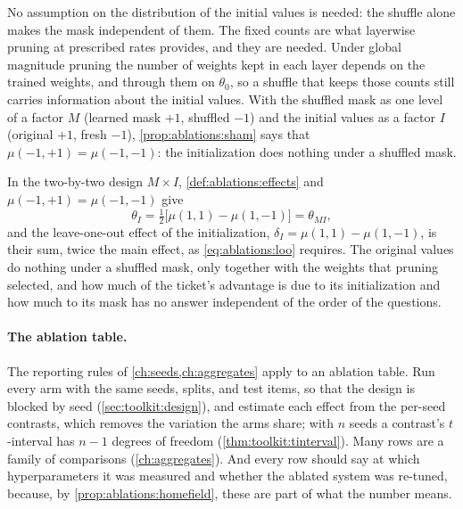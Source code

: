 \begin{refsection}
No assumption on the distribution of the initial values is needed: the shuffle alone makes the mask independent of them. The fixed counts are what layerwise pruning at prescribed rates provides, and they are needed. Under global magnitude pruning the number of weights kept in each layer depends on the trained weights, and through them on $\theta_0$, so a shuffle that keeps those counts still carries information about the initial values. With the shuffled mask as one level of a factor $M$ (learned mask $+1$, shuffled $-1$) and the initial values as a factor $I$ (original $+1$, fresh $-1$), \cref{prop:ablations:sham} says that $\mu(-1,+1)=\mu(-1,-1)$: the initialization does nothing under a shuffled mask.

\begin{example}\label{exa:ablations:pure}
In the two-by-two design $M\times I$, \cref{def:ablations:effects} and $\mu(-1,+1)=\mu(-1,-1)$ give
\[
\theta_I=\tfrac12\bigl[\mu(1,1)-\mu(1,-1)\bigr]=\theta_{MI},
\]
and the leave-one-out effect of the initialization, $\delta_I=\mu(1,1)-\mu(1,-1)$, is their sum, twice the main effect, as \eqref{eq:ablations:loo} requires. The original values do nothing under a shuffled mask, only together with the weights that pruning selected, and how much of the ticket's advantage is due to its initialization and how much to its mask has no answer independent of the order of the questions.
\end{example}

\paragraph{The ablation table.} The reporting rules of \cref{ch:seeds,ch:aggregates} apply to an ablation table. Run every arm with the same seeds, splits, and test items, so that the design is blocked by seed (\cref{sec:toolkit:design}), and estimate each effect from the per-seed contrasts, which removes the variation the arms share; with $n$ seeds a contrast's $t$-interval has $n-1$ degrees of freedom (\cref{thm:toolkit:tinterval}). Many rows are a family of comparisons (\cref{ch:aggregates}). And every row should say at which hyperparameters it was measured and whether the ablated system was re-tuned, because, by \cref{prop:ablations:homefield}, these are part of what the number means.


\end{refsection}
